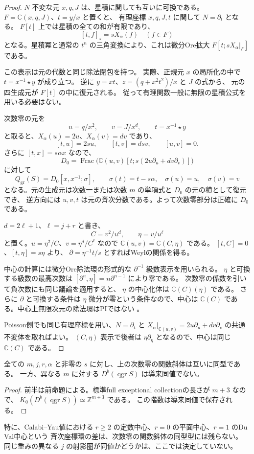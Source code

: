 \begin{proof}
$N$ 不変な元 $x,q,J$ は、星積に関しても互いに可換である。
$F=\mathbb C(x,q,J)$、$t=y/x$ と置くと、
有理座標 $x,q,J,t$ に関して $N=\partial_t$ となる。
$F[t]$ 上では星積の全ての和が有限であり、
\[
 [t,f]_\star=sX_\alpha(f)\quad(f\in F)
\]
となる。星積冪と通常の $t^n$ の三角変換により、これは微分Ore拡大
$F[t;sX_\alpha|_F]$ である。

この表示は元の代数と同じ除法閉包を持つ。
実際、正規元 $x$ の局所化の中で $t=x^{-1}\star y$ が成り立つ。
逆に $y=xt$、$z=(q+x^2t^2)/x$ と $J$ の式から、
元の四生成元が $F[t]$ の中に復元される。
従って有理関数一般に無限の星積公式を用いる必要はない。

次数零の元を
\[
 u=q/x^2,\qquad v=J/x^d,\qquad t=x^{-1}\star y
\]
と取ると、$X_\alpha(u)=2u$、$X_\alpha(v)=dv$ であり、
\[
 [t,u]=2su,\qquad[t,v]=dsv,\qquad[u,v]=0.
\]
さらに $[t,x]=s\alpha x$ なので、
\[
 D_0=\operatorname{Frac}\bigl(\mathbb C(u,v)[t;s(2u\partial_u+dv\partial_v)]\bigr)
\]
に対して
\[
 Q_{\mathrm{gr}}(S)=D_0[x,x^{-1};\sigma],\qquad
 \sigma(t)=t-s\alpha,\quad\sigma(u)=u,\quad\sigma(v)=v
\]
となる。元の生成元は次数一または次数 $m$ の単項式と $D_0$ の元の積として復元でき、
逆方向には $u,v,t$ は元の斉次分数である。よって次数零部分は正確に $D_0$ である。

$d=2\ell+1$、$\ell=j+r$ と書き、
\[
 C=v^2/u^d,\qquad\eta=v/u^\ell
\]
と置く。$u=\eta^2/C$、$v=\eta^d/C^\ell$ なので
$\mathbb C(u,v)=\mathbb C(C,\eta)$ である。
$[t,C]=0$、$[t,\eta]=s\eta$ より、
$\partial=\eta^{-1}t/s$ とすればWeylの関係を得る。

中心の計算には微分Ore除法環の形式的な $\partial^{-1}$ 級数表示を用いられる。
$\eta$ と可換する級数の最高次数は
$[\partial^n,\eta]=n\partial^{n-1}$ により零である。
次数零の係数を引いて負次数にも同じ議論を適用すると、
$\eta$ の中心化体は $\mathbb C(C)(\eta)$ である。
さらに $\partial$ と可換する条件は $\eta$ 微分が零という条件なので、中心は
$\mathbb C(C)$ である。中心上無限次元の除法環はPIではない
\cite[Part~II, Theorem~50]{Kaplansky1972}。

Poisson側でも同じ有理座標を用い、$N=\partial_t$ と
$X_\alpha|_{\mathbb C(u,v)}=2u\partial_u+dv\partial_v$ の共通不変体を取ればよい。
$(C,\eta)$ 表示で後者は $\eta\partial_\eta$ となるので、中心は同じ $\mathbb C(C)$ である。
\end{proof}

\begin{corollary}[関数斜体と射影圏の区別]
全ての $m,j,r,\alpha$ と非零の $s$ に対し、上の次数零の関数斜体は互いに同型である。
一方、異なる $m$ に対する $D^b(\operatorname{qgr}S)$ は導来同値でない。
\end{corollary}
\begin{proof}
前半は前命題による。標準full exceptional collectionの長さが $m+3$ なので、
$K_0(D^b(\operatorname{qgr}S))\simeq\mathbb Z^{m+3}$ である。
この階数は導来同値で保存される。
\end{proof}

特に、Calabi--Yau値における $r\ge2$ の定数中心、$r=0$ の平面中心、$r=1$ のDu Val中心という
斉次座標環の差は、次数零の関数斜体の同型型には残らない。
同じ重みの異なる $j$ の射影圏が同値かどうかは、ここでは決定していない。
